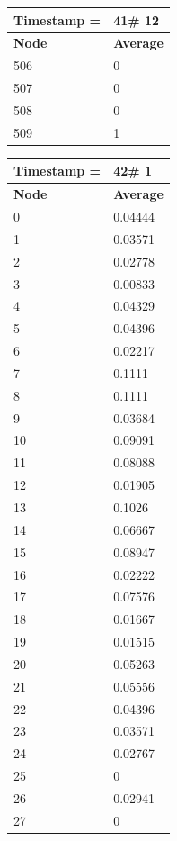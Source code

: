 \begin{tabular}{|l||l|}
\hline
\textbf{Timestamp =} & \textbf{41}\# 12\\\hline
	\textbf{Node} & \textbf{Average} \\ \hline
\hline
	506 & 0 \\ \hline
	507 & 0 \\ \hline
	508 & 0 \\ \hline
	509 & 1 \\ \hline
\end{tabular}

\begin{tabular}{|l||l|}
\hline
\textbf{Timestamp =} & \textbf{42}\# 1\\\hline
	\textbf{Node} & \textbf{Average} \\ \hline
\hline
	0 & 0.04444 \\ \hline
	1 & 0.03571 \\ \hline
	2 & 0.02778 \\ \hline
	3 & 0.00833 \\ \hline
	4 & 0.04329 \\ \hline
	5 & 0.04396 \\ \hline
	6 & 0.02217 \\ \hline
	7 & 0.1111 \\ \hline
	8 & 0.1111 \\ \hline
	9 & 0.03684 \\ \hline
	10 & 0.09091 \\ \hline
	11 & 0.08088 \\ \hline
	12 & 0.01905 \\ \hline
	13 & 0.1026 \\ \hline
	14 & 0.06667 \\ \hline
	15 & 0.08947 \\ \hline
	16 & 0.02222 \\ \hline
	17 & 0.07576 \\ \hline
	18 & 0.01667 \\ \hline
	19 & 0.01515 \\ \hline
	20 & 0.05263 \\ \hline
	21 & 0.05556 \\ \hline
	22 & 0.04396 \\ \hline
	23 & 0.03571 \\ \hline
	24 & 0.02767 \\ \hline
	25 & 0 \\ \hline
	26 & 0.02941 \\ \hline
	27 & 0 \\ \hline

\end{tabular}
